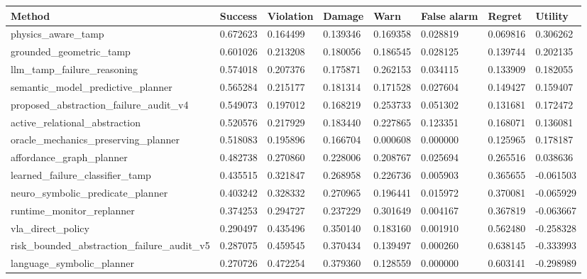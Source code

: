 \begin{tabular}{llllllll}
\toprule
Method & Success & Violation & Damage & Warn & False alarm & Regret & Utility \\
\midrule
physics\_aware\_tamp & 0.672623 & 0.164499 & 0.139346 & 0.169358 & 0.028819 & 0.069816 & 0.306262 \\
grounded\_geometric\_tamp & 0.601026 & 0.213208 & 0.180056 & 0.186545 & 0.028125 & 0.139744 & 0.202135 \\
llm\_tamp\_failure\_reasoning & 0.574018 & 0.207376 & 0.175871 & 0.262153 & 0.034115 & 0.133909 & 0.182055 \\
semantic\_model\_predictive\_planner & 0.565284 & 0.215177 & 0.181314 & 0.171528 & 0.027604 & 0.149427 & 0.159407 \\
proposed\_abstraction\_failure\_audit\_v4 & 0.549073 & 0.197012 & 0.168219 & 0.253733 & 0.051302 & 0.131681 & 0.172472 \\
active\_relational\_abstraction & 0.520576 & 0.217929 & 0.183440 & 0.227865 & 0.123351 & 0.168071 & 0.136081 \\
oracle\_mechanics\_preserving\_planner & 0.518083 & 0.195896 & 0.166704 & 0.000608 & 0.000000 & 0.125965 & 0.178187 \\
affordance\_graph\_planner & 0.482738 & 0.270860 & 0.228006 & 0.208767 & 0.025694 & 0.265516 & 0.038636 \\
learned\_failure\_classifier\_tamp & 0.435515 & 0.321847 & 0.268958 & 0.226736 & 0.005903 & 0.365655 & -0.061503 \\
neuro\_symbolic\_predicate\_planner & 0.403242 & 0.328332 & 0.270965 & 0.196441 & 0.015972 & 0.370081 & -0.065929 \\
runtime\_monitor\_replanner & 0.374253 & 0.294727 & 0.237229 & 0.301649 & 0.004167 & 0.367819 & -0.063667 \\
vla\_direct\_policy & 0.290497 & 0.435496 & 0.350140 & 0.183160 & 0.001910 & 0.562480 & -0.258328 \\
risk\_bounded\_abstraction\_failure\_audit\_v5 & 0.287075 & 0.459545 & 0.370434 & 0.139497 & 0.000260 & 0.638145 & -0.333993 \\
language\_symbolic\_planner & 0.270726 & 0.472254 & 0.379360 & 0.128559 & 0.000000 & 0.603141 & -0.298989 \\
\bottomrule
\end{tabular}
